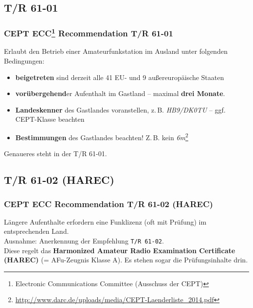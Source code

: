 \subsection{T/R 61-01}

\begin{frame}
    \frametitle{CEPT ECC\footnote{Electronic Communications Committee (Ausschuss
    der CEPT)} Recommendation T/R 61-01}

    Erlaubt den Betrieb einer Amateurfunkstation im Ausland unter folgenden
    Bedingungen:

    \begin{itemize}
        \item \textbf{beigetreten} sind derzeit alle 41 EU- und 9
              außereuropäische Staaten
        \item \textbf{vorübergehend}er Aufenthalt im Gastland -- maximal
              \textbf{drei Monate}.
        \item \textbf{Landeskenner} des Gastlandes voranstellen, z.\,B.
              \emph{HB9/DK0TU} -- ggf. CEPT-Klasse beachten
        \item \textbf{Bestimmungen} des Gastlandes beachten! Z.\,B. kein
              \emph{6m}\footnote{\scriptsize\url{http://www.darc.de/uploads/media/CEPT-Laenderliste_2014.pdf}}
    \end{itemize}

    Genaueres steht in der T/R 61-01.

\end{frame}

\subsection{T/R 61-02 (HAREC)}

\begin{frame}
    \frametitle{CEPT ECC Recommendation T/R 61-02 (HAREC)}

    Längere Aufenthalte erfordern eine Funklizenz (oft mit Prüfung) im
    entsprechenden Land. \\[1em]

    Ausnahme: Anerkennung der Empfehlung \texttt{T/R 61-02}. \\[1em]

    Diese regelt das \textbf{Harmonized Amateur Radio Examination Certificate
    (HAREC)} (= AFu-Zeugnis Klasse A). Es stehen sogar die Prüfungsinhalte drin.

\end{frame}

